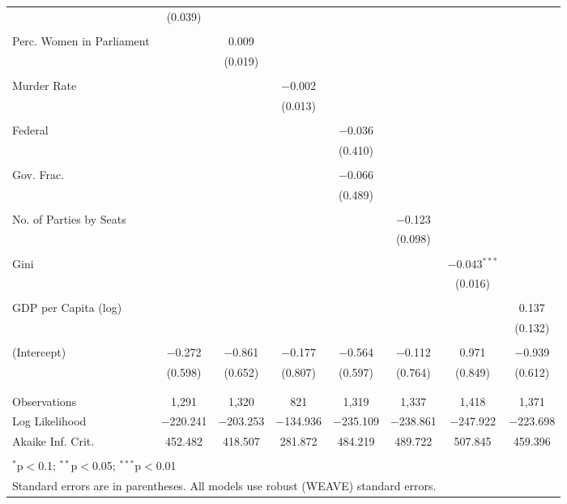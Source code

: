 \documentclass[a4paper]{article}\usepackage[]{graphicx}\usepackage[]{color}
\begin{document}
\begin{table}[H]
\begin{center}
{\begin{tabular}{@{\extracolsep{5pt}}lccccccc}
  & (0.039) &  &  &  &  &  &  \\ 
  & & & & & & & \\ 
 Perc. Women in Parliament &  & 0.009 &  &  &  &  &  \\ 
  &  & (0.019) &  &  &  &  &  \\ 
  & & & & & & & \\ 
 Murder Rate &  &  & $-$0.002 &  &  &  &  \\ 
  &  &  & (0.013) &  &  &  &  \\ 
  & & & & & & & \\ 
 Federal &  &  &  & $-$0.036 &  &  &  \\ 
  &  &  &  & (0.410) &  &  &  \\ 
  & & & & & & & \\ 
 Gov. Frac. &  &  &  & $-$0.066 &  &  &  \\ 
  &  &  &  & (0.489) &  &  &  \\ 
  & & & & & & & \\ 
 No. of Parties by Seats &  &  &  &  & $-$0.123 &  &  \\ 
  &  &  &  &  & (0.098) &  &  \\ 
  & & & & & & & \\ 
 Gini &  &  &  &  &  & $-$0.043$^{***}$ &  \\ 
  &  &  &  &  &  & (0.016) &  \\ 
  & & & & & & & \\ 
 GDP per Capita (log) &  &  &  &  &  &  & 0.137 \\ 
  &  &  &  &  &  &  & (0.132) \\ 
  & & & & & & & \\ 
 (Intercept) & $-$0.272 & $-$0.861 & $-$0.177 & $-$0.564 & $-$0.112 & 0.971 & $-$0.939 \\ 
  & (0.598) & (0.652) & (0.807) & (0.597) & (0.764) & (0.849) & (0.612) \\ 
  & & & & & & & \\ 
\hline \\[-1.8ex] 
Observations & 1,291 & 1,320 & 821 & 1,319 & 1,337 & 1,418 & 1,371 \\ 
Log Likelihood & $-$220.241 & $-$203.253 & $-$134.936 & $-$235.109 & $-$238.861 & $-$247.922 & $-$223.698 \\ 
Akaike Inf. Crit. & 452.482 & 418.507 & 281.872 & 484.219 & 489.722 & 507.845 & 459.396 \\ 
\hline 
\hline \\[-1.8ex] 
\multicolumn{8}{l}{$^{*}$p$<$0.1; $^{**}$p$<$0.05; $^{***}$p$<$0.01} \\ 
\multicolumn{8}{l}{Standard errors are in parentheses. All models use robust (WEAVE) standard errors.} \\ 
\end{tabular} 

}
\end{center}
\end{table}
\end{document}
